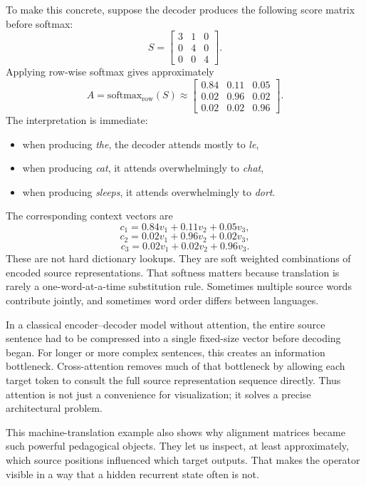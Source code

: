 To make this concrete, suppose the decoder produces the following score matrix before softmax:
\[
S=
\begin{bmatrix}
3 & 1 & 0\\
0 & 4 & 0\\
0 & 0 & 4
\end{bmatrix}.
\]
Applying row-wise softmax gives approximately
\[
A=\mathrm{softmax}_{\mathrm{row}}(S)
\approx
\begin{bmatrix}
0.84 & 0.11 & 0.05\\
0.02 & 0.96 & 0.02\\
0.02 & 0.02 & 0.96
\end{bmatrix}.
\]
The interpretation is immediate:
\begin{itemize}
    \item when producing \emph{the}, the decoder attends mostly to \emph{le},
    \item when producing \emph{cat}, it attends overwhelmingly to \emph{chat},
    \item when producing \emph{sleeps}, it attends overwhelmingly to \emph{dort}.
\end{itemize}
The corresponding context vectors are
\[
c_1 = 0.84v_1+0.11v_2+0.05v_3,
\]
\[
c_2 = 0.02v_1+0.96v_2+0.02v_3,
\]
\[
c_3 = 0.02v_1+0.02v_2+0.96v_3.
\]
These are not hard dictionary lookups.
They are soft weighted combinations of encoded source representations.
That softness matters because translation is rarely a one-word-at-a-time substitution rule.
Sometimes multiple source words contribute jointly, and sometimes word order differs between languages.

\begin{example}
In a classical encoder--decoder model without attention, the entire source sentence had to be compressed into a single fixed-size vector before decoding began.
For longer or more complex sentences, this creates an information bottleneck.
Cross-attention removes much of that bottleneck by allowing each target token to consult the full source representation sequence directly.
Thus attention is not just a convenience for visualization; it solves a precise architectural problem.
\end{example}

This machine-translation example also shows why alignment matrices became such powerful pedagogical objects.
They let us inspect, at least approximately, which source positions influenced which target outputs.
That makes the operator visible in a way that a hidden recurrent state often is not.

